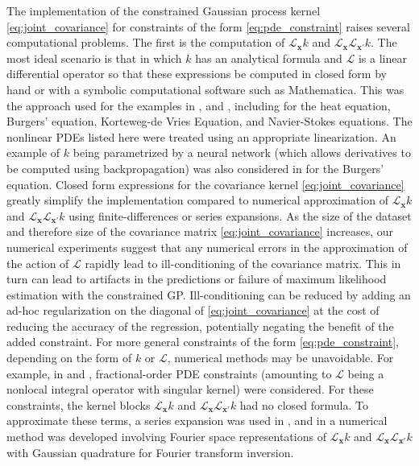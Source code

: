 The implementation of the constrained Gaussian process kernel \eqref{eq:joint_covariance} for constraints of the form
\eqref{eq:pde_constraint} raises several computational problems.
The first is the computation of $\mathcal{L}_{\mathbf{x}}k$ and $\mathcal{L}_{\mathbf{x}} \mathcal{L}_{\mathbf{x'}}k$. The most ideal scenario is that in which $k$ has an analytical formula and $\mathcal{L}$ is a linear differential operator so that these expressions be computed in closed form by hand or with a symbolic computational software such as Mathematica. This was the approach used for the examples in ,  and , including for the heat equation, Burgers' equation, Korteweg-de Vries Equation, and Navier-Stokes equations. The nonlinear PDEs listed here were treated using an appropriate linearization. An example of $k$ being parametrized by a neural network (which allows derivatives to be computed using backpropagation) was also considered in  for the Burgers' equation. 
Closed form expressions for the covariance kernel \eqref{eq:joint_covariance} greatly simplify the implementation compared to numerical approximation of $\mathcal{L}_{\mathbf{x}}k$ and $\mathcal{L}_{\mathbf{x}} \mathcal{L}_{\mathbf{x'}}k$ using finite-differences or series expansions. As the size of the dataset and therefore size of the covariance matrix \eqref{eq:joint_covariance} increases, our numerical experiments suggest that any numerical errors in the approximation of the action of $\mathcal{L}$ rapidly lead to ill-conditioning of the covariance matrix. This in turn can lead to artifacts in the predictions or failure of maximum likelihood estimation with the constrained GP. Ill-conditioning can be reduced by adding an ad-hoc regularization on the diagonal of \eqref{eq:joint_covariance} at the cost of reducing the accuracy of the regression, potentially negating the benefit of the added constraint.
For more general constraints of the form \eqref{eq:pde_constraint}, depending on the form of $k$ or $\mathcal{L}$, numerical methods may be unavoidable. For example, in  and , fractional-order PDE constraints (amounting to $\mathcal{L}$ being a nonlocal integral operator with singular kernel) were considered. For these constraints, the kernel blocks $\mathcal{L}_{\mathbf{x}}k$ and $\mathcal{L}_{\mathbf{x}} \mathcal{L}_{\mathbf{x'}}k$ had no closed formula. To approximate these terms, a series expansion was used in , and in  a numerical method was developed involving Fourier space representations of $\mathcal{L}_{\mathbf{x}}k$ and $\mathcal{L}_{\mathbf{x}} \mathcal{L}_{\mathbf{x'}}k$ with Gaussian quadrature for Fourier transform inversion. 
